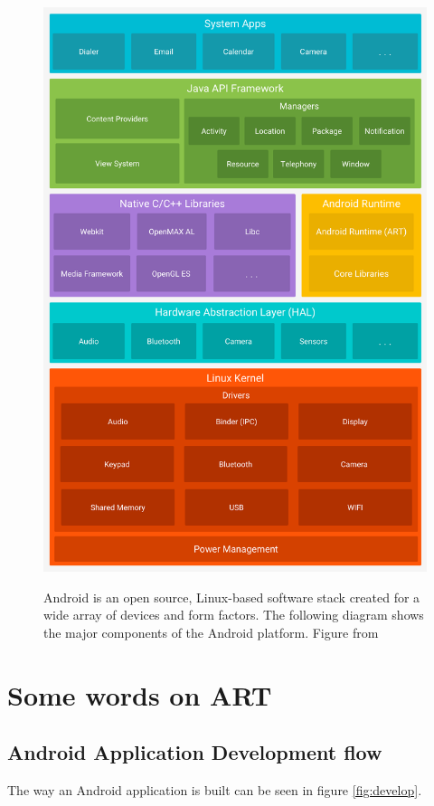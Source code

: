 \begin{figure}[ht]
	\centering
	\includegraphics[width=\textwidth]{images/hello/android-stack.png}
	\label{fig:stack}
	\caption{Android is an open source, Linux-based software stack created for a wide array of devices and form factors. The following diagram shows the major components of the Android platform. Figure from \cite{google2017}}
\end{figure}

\section{Some words on ART}
\subsection{Android Application Development flow}
The way an Android application is built can be seen in figure \ref{fig:develop}.

